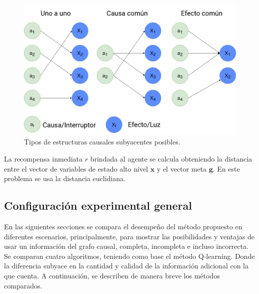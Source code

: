 \begin{figure}[H]
    \centering
    \includegraphics[scale=0.2]{Chapter5/Figs/switches_struct.png}
    \caption{Tipos de estructuras causales subyacentes posibles.}
    \label{fig:struct}
\end{figure}
La recompensa inmediata $r$ brindada al agente se calcula obteniendo la distancia entre el vector de variables de estado alto nivel $\mathbf{x}$ y el vector meta $\mathbf{g}$. En este problema se usa la distancia euclidiana.


\subsection{Configuración experimental general}

En las siguientes secciones se compara el desempeño 
del método propuesto en diferentes escenarios, principalmente, para mostrar 
las posibilidades y ventajas de usar un información del grafo causal, completa, incompleta e incluso incorrecta. 
Se comparan cuatro algoritmos, teniendo como base
el método Q-learning. Donde la diferencia subyace en la cantidad y calidad de la información adicional con la que cuenta. A continuación, se describen de manera breve los métodos
comparados.

